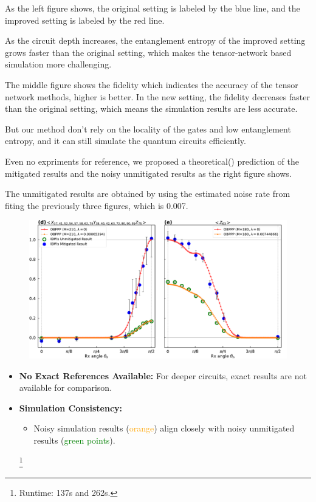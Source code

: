 \documentclass[10pt]{beamer}
\begin{document}
\begin{CJK}{UTF8}{gbsn}
{ As the left figure shows, the original setting is labeled by the blue line, and the improved setting is labeled by the red line.

 As the circuit depth increases, the entanglement entropy of the improved setting grows faster than the original setting, which makes the tensor-network based simulation more challenging.

 The middle figure shows the fidelity which indicates the accuracy of the tensor network methods, higher is better. In the new setting, the fidelity decreases faster than the original setting, which means the simulation results are less accurate.

 But our method don't rely on the locality of the gates and low entanglement entropy, and it can still simulate the quantum circuits efficiently.

 Even no expriments for reference, we proposed a theoretical() prediction of the mitigated results and the noisy unmitigated results as the right figure shows.

 The unmitigated results are obtained by using the estimated noise rate from fiting the previously three figures, which is 0.007.
}


\begin{frame}[fragile]
  \begin{figure}
    \centering
    \includegraphics[width=\textwidth]{fig/simibm2.pdf}
  \end{figure}
  \begin{itemize}
    \item \textbf{No Exact References Available:} For deeper circuits, exact results are not available for comparison.
    \item \textbf{Simulation Consistency:}
    \begin{itemize}
        \item Noisy simulation results (\textcolor{orange}{orange}) align closely with noisy unmitigated results (\textcolor{green}{green points}).
    \end{itemize}
    \footnote{Runtime: 137s and 262s.}
\end{itemize}


\end{frame}
\end{CJK}
\end{document}
